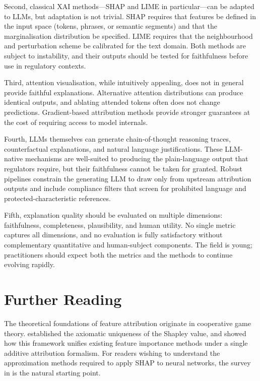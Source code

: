 Second, classical XAI methods---SHAP and LIME in particular---can be adapted to LLMs,
but adaptation is not trivial. SHAP requires that features be defined in the input space
(tokens, phrases, or semantic segments) and that the marginalisation distribution be
specified. LIME requires that the neighbourhood and perturbation scheme be calibrated for
the text domain. Both methods are subject to instability, and their outputs should be
tested for faithfulness before use in regulatory contexts.

Third, attention visualisation, while intuitively appealing, does not in general provide
faithful explanations. Alternative attention distributions can produce identical outputs,
and ablating attended tokens often does not change predictions. Gradient-based attribution
methods provide stronger guarantees at the cost of requiring access to model internals.

Fourth, LLMs themselves can generate chain-of-thought reasoning traces, counterfactual
explanations, and natural language justifications. These LLM-native mechanisms are
well-suited to producing the plain-language output that regulators require, but their
faithfulness cannot be taken for granted. Robust pipelines constrain the generating LLM
to draw only from upstream attribution outputs and include compliance filters that screen
for prohibited language and protected-characteristic references.

Fifth, explanation quality should be evaluated on multiple dimensions: faithfulness,
completeness, plausibility, and human utility. No single metric captures all dimensions,
and no evaluation is fully satisfactory without complementary quantitative and
human-subject components. The field is young; practitioners should expect both the
metrics and the methods to continue evolving rapidly.

\section{Further Reading}
\label{sec:ch12-further-reading}

The theoretical foundations of feature attribution originate in cooperative game theory.
\citet{shapley1953value} established the axiomatic uniqueness of the Shapley value, and
\citet{lundberg2017unified} showed how this framework unifies existing feature importance
methods under a single additive attribution formalism. For readers wishing to understand
the approximation methods required to apply SHAP to neural networks, the survey in
\citet{lundberg2020local} is the natural starting point.

